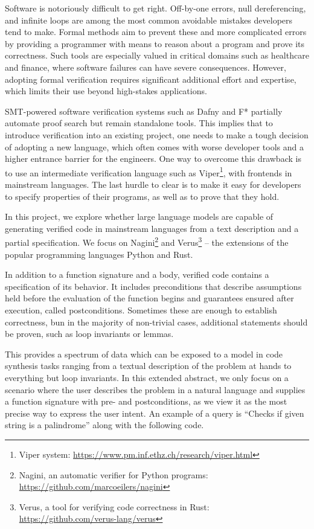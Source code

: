 Software is notoriously difficult to get right. 
Off-by-one errors, null dereferencing, and infinite loops are among the most common avoidable mistakes developers tend to make. 
Formal methods aim to prevent these and more complicated errors by providing a programmer with means to reason about a program and prove its correctness.  
Such tools are especially valued in critical domains such as healthcare and finance, where software failures can have severe consequences. 
However, adopting formal verification requires significant additional effort and expertise, which limits their use beyond high-stakes applications.

SMT-powered software verification systems such as Dafny and F* partially automate proof search but remain standalone tools. 
This implies that to introduce verification into an existing project, one needs to make a tough decision of adopting a new language, which often comes with worse developer tools and a higher entrance barrier for the engineers. 
One way to overcome this drawback is to use an intermediate verification language such as Viper\footnote{Viper system: \url{https://www.pm.inf.ethz.ch/research/viper.html}}, with frontends in mainstream languages.
The last hurdle to clear is to make it easy for developers to specify properties of their programs, as well as to prove that they hold. 

In this project, we explore whether large language models are capable of generating verified code in mainstream languages from a text description and a partial specification. 
We focus on Nagini\footnote{Nagini, an automatic verifier for Python programs: \url{https://github.com/marcoeilers/nagini}} and Verus\footnote{Verus, a tool for verifying code correctness in Rust: \url{https://github.com/verus-lang/verus}} -- the extensions of the popular programming languages Python and Rust. 


In addition to a function signature and a body, verified code contains a specification of its behavior. 
It includes preconditions that describe assumptions held before the evaluation of the function begins and guarantees ensured after execution, called postconditions.
Sometimes these are enough to establish correctness, bun in the majority of non-trivial cases, additional statements should be proven, such as loop invariants or lemmas.

This provides a spectrum of data which can be exposed to a model in code synthesis tasks ranging from a textual description of the problem at hands to everything but loop invariants. 
In this extended abstract, we only focus on a scenario where the user describes the problem in a natural language and supplies a function signature with pre- and postconditions, as we view it as the most precise way to express the user intent. 
An example of a query is ``Checks if given string is a palindrome'' along with the following code. 

